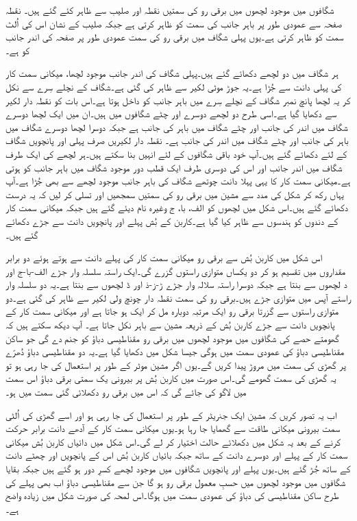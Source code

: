 شگافوں میں موجود لچھوں میں برقی رو کی سمتیں نقطہ اور صلیب سے ظاہر کئے گئے ہیں۔ نقطہ صفحہ سے عمودی طور پر باہر جانب کی سمت کو ظاہر کرتی ہے جبکہ صلیب کے نشان اس کی اُلٹ سمت کو ظاہر کرتی ہے۔یوں پہلی شگاف میں برقی رو کی سمت عمودی طور پر صفحہ کی اندر جانب کو ہے۔

ہر شگاف میں دو لچھے دکھائے گئے ہیں۔پہلی شگاف کی اندر جانب موجود لچھا، میکانی سمت کار کی پہلی دانت سے جُڑا ہے۔یہ جوڑ موٹی لکیر سے ظاہر کی گئی ہے۔شگاف کے نچلے سِرے سے نکل کر یہ لچھا پانچ نمبر شگاف کے نچلے سِرے میں باہر جانب کو داخل ہوتا ہے۔اس بات کو نقطہ دار لکیر سے دکھایا گیا ہے۔اسی طرح دو لچھے دوسرے اور چٹے شگافوں میں ہیں۔ان میں ایک لچھا دوسرے شگاف میں اندر کی جانب اور چٹے شگاف میں باہر کی جانب ہے جبکہ دوسرا لچھا دوسرے شگاف میں باہر کی جانب اور چٹے شگاف میں اندر کی جانب ہے۔ نقطہ دار لکیریں صرف پہلی اور پانچویں شگاف کے لئے دکھائے گئے ہیں۔آپ خود باقی شگافوں کے لئے انہیں بنا سکتے ہیں۔ہر لچھے کی ایک طرف شگاف میں اندر جانب  اور اس کی دوسری طرف ایک قطب دور موجود شگاف میں باہر جانب کو ہوتی ہے۔میکانی سمت کار کا یہی پہلا دانت چوتھے شگاف کی باہر جانب موجود لچھے سے بھی جُڑا ہے۔آپ یہاں رکھ کر شکل  کی مدد سے مشین میں برقی رو کی سمتیں سمجھیں اور تسلی کر لیں کہ یہ درست دکھائے گئے ہیں۔اس شکل میں لچھوں کو الف، با، ج وغیرہ نام دیئے گئے ہیں جبکہ میکانی سمت کار کے دندوں کو ہندسوں سے ظاہر کیا گیا ہے۔کاربن کے بُش پہلے اور پانچویں دانت سے جڑے دکھائے گئے ہیں۔

اس شکل میں کاربن بُش سے برقی رو میکانی سمت کار کی پہلے دانت سے ہوتے ہوئے دو برابر مقداروں میں تقسیم ہو کر دو یکساں متوازی راستوں گزرے گی۔ایک راستہ سلسلہ وار جڑے الف-با-ج اور د لچھوں سے بنتا ہے جبکہ دوسرا راستہ سلالہ وار جڑے ڑ-ز-ذ اور ڈ لچھوں سے بنتا ہے۔یہ دو سلسلہ وار راستے آپس میں متوازی جڑے ہیں۔برقی رو کی سمت نقطہ دار چونچ ولی لکیر سے ظاہر کی گئی ہے۔دو متوازی راستوں سے گزرتا برقی رو ایک مرتبہ دوبارہ مل کر ایک ہو جاتا ہے اور میکانی سمت کار کے پانچویں دانت سے جڑے کاربن بُش کے ذریعہ مشین سے باہر نکل جاتا ہے۔ آپ دیکھ سکتے ہیں کہ گھومتے حصے کی شگافوں میں موجود لچھوں میں برقی رو مقناطیسی دباؤ کو جنم دے گی جو ساکن مقناطیسی دباؤ کی عمودی سمت میں ہوگی جیسا شکل  میں دکھایا گیا ہے۔یہ دو مقناطیسی دباؤ دُھرّے پر گھڑی کی سمت میں مروڑ پیدا کریں گے۔یوں اگر مشین موٹر کے طور پر استعمال کی جا رہی ہو تو یہ گھڑی کی سمت گھومے گی۔اس صورت میں کاربن بُش پر بیرونی یک سمتی برقی دباؤ اس سمت میں لاگو کی جائے گی کہ اس میں برقی رو دکھلائی گئی سمت میں ہو۔


اب یہ تصور کریں کہ مشین ایک جنریٹر کے طور پر استعمال کی جا رہی ہو اور اسے گھڑی کی اُلٹی سمت بیرونی میکانی طاقت سے گھمایا جا رہا ہو۔یوں میکانی سمت کار کے آدھے دانت برابر حرکت کرنے کے بعد یہ شکل  میں دکھلائے حالت اختیار کر لے گی۔اس شکل میں دائیاں کاربن بُش میکانی سمت کار کے پہلے اور دوسرے دانت کے ساتھ جبکہ بائیاں کاربن بُش اس کے پانچویں اور چھٹے دانت کے ساتھ جُڑ گئے ہیں۔یوں پہلے اور پانچویں شگافوں میں موجود لچھے کسرِ دور ہو گئے ہیں جبکہ بقایا شگافوں میں موجود لچھوں میں حسبِ معمول برقی رو ہو گا جن سے مقناطیسی دباؤ اب بھی پہلے کی طرح ساکن مقناطیسی کی دباؤ کی عمودی سمت میں ہوگا۔اس لمحہ کی صورت شکل  میں زیادہ واضح ہے۔

